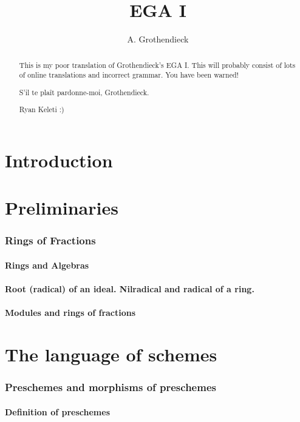 \documentclass[10pt]{amsart}
\title{EGA I}
\author{A. Grothendieck}
\begin{document}
\renewcommand{\abstractname}{What this is}
\begin{abstract}
    This is my poor translation of Grothendieck's EGA I. This
    will probably consist of lots of online translations and incorrect grammar.
    You have been warned!

    S'il te pla\^it pardonne-moi, Grothendieck.

    Ryan Keleti :)
\end{abstract}

\maketitle

\noindent\hspace{0.15\linewidth}
\begin{minipage}{0.7\linewidth}
    \tableofcontents{}
\end{minipage}


\clearpage


\part*{Introduction}



\clearpage


\setcounter{part}{-1}

\part{Preliminaries}

    \section{Rings of Fractions}

        \subsection{Rings and Algebras}
        

        \subsection*{Root (radical) of an ideal. Nilradical and radical of a ring.}
        

        \subsection*{Modules and rings of fractions}
        


\clearpage


\part{The language of schemes}

    \section{Preschemes and morphisms of preschemes}

        \subsection{Definition of preschemes}
        
\end{document}
